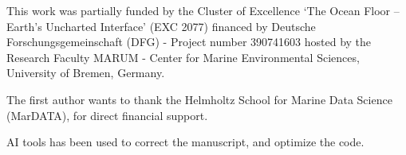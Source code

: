 \documentclass[journal abbreviation, manuscript]{copernicus}
\begin{document}


\begin{acknowledgements}
This work was partially funded by the Cluster of Excellence `The Ocean Floor – Earth’s Uncharted Interface' (EXC 2077) financed by Deutsche Forschungsgemeinschaft (DFG) - Project number 390741603 hosted by the Research Faculty MARUM - Center for Marine Environmental Sciences, University of Bremen, Germany.

The first author wants to thank the Helmholtz School for Marine Data Science (MarDATA), for direct financial support. 

AI tools has been used to correct the manuscript, and optimize the code.
\end{acknowledgements}





\newpage


\end{document}
